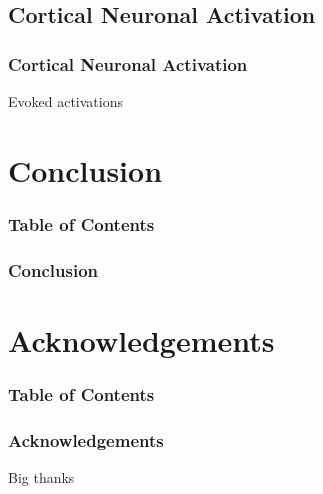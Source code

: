 \documentclass{beamer}
\begin{document}
\subsection{Cortical Neuronal Activation}
\begin{frame}
    \frametitle{Cortical Neuronal Activation}
    Evoked activations
\end{frame}

\section{Conclusion}
\begin{frame}[plain]
    \frametitle{Table of Contents}
\end{frame}

\begin{frame}
    \frametitle{Conclusion}

\end{frame}

\section{Acknowledgements}
\begin{frame}[plain]
    \frametitle{Table of Contents}
\end{frame}

\begin{frame}
    \frametitle{Acknowledgements}
    Big thanks
\end{frame}
\end{document}
